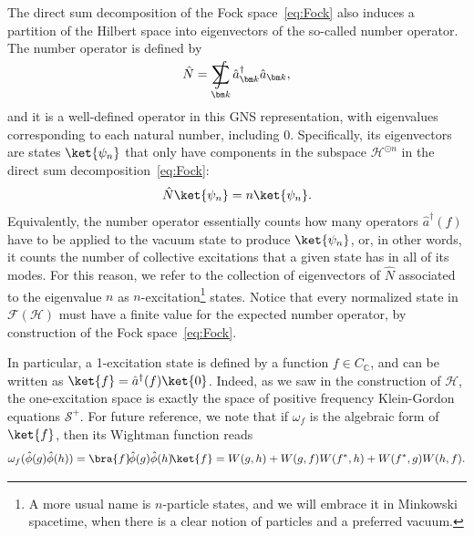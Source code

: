 \documentclass[letterpaper,12pt,titlepage,oneside,final]{book}
\renewcommand{\S}{\mathcal{S}}
\DeclareMathOperator*{\sumint}{%
\mathchoice%
  {\ooalign{$\displaystyle\sum$\cr\hidewidth$\displaystyle\int$\hidewidth\cr}}
  {\ooalign{\raisebox{.14\height}{\scalebox{.7}{$\textstyle\sum$}}\cr\hidewidth$\textstyle\int$\hidewidth\cr}}
  {\ooalign{\raisebox{.2\height}{\scalebox{.6}{$\scriptstyle\sum$}}\cr$\scriptstyle\int$\cr}}
  {\ooalign{\raisebox{.2\height}{\scalebox{.6}{$\scriptstyle\sum$}}\cr$\scriptstyle\int$\cr}}
}
\begin{document}
The direct sum decomposition of the Fock space~\eqref{eq:Fock} also induces a partition of the Hilbert space into eigenvectors of the so-called number operator. The number operator is defined by
\begin{equation}
    \hat{N} = \sumint_{\bm k} \hat{a}_{\bm k}^\dagger \hat{a}_{\bm k},
\end{equation}
and it is a well-defined operator in this GNS representation, with eigenvalues corresponding to each natural number, including $0$. Specifically, its eigenvectors are states $\ket{\psi_n}$ that only have components in the subspace $\mathscr{H}^{\odot n}$ in the direct sum decomposition~\eqref{eq:Fock}:
\begin{equation}
    \hat{N} \ket{\psi_n} = n \ket{\psi_n}.
\end{equation}
Equivalently, the number operator essentially counts how many operators $\hat{a}^\dagger(f)$ have to be applied to the vacuum state to produce $\ket{\psi_n}$, or, in other words, it counts the number of collective excitations that a given state has in all of its modes. For this reason, we refer to the collection of eigenvectors of $\hat{N}$ associated to the eigenvalue $n$ as $n$-excitation\footnote{A more usual name is $n$-particle states, and we will embrace it in Minkowski spacetime, when there is a clear notion of particles and a preferred vacuum.} states. Notice that every normalized state in $\mathcal{F}(\mathscr{H})$ must have a finite value for the expected number operator, by construction of the Fock space~\eqref{eq:Fock}.

In particular, a 1-excitation state is defined by a function $f\in C_\mathbb{C}$, and can be written as $\ket{f} = \hat{a}^\dagger(f) \ket{0}$. Indeed, as we saw in the construction of $\mathscr{H}$, the one-excitation space is exactly the space of positive frequency Klein-Gordon equations $\S^+$. For future reference, we note that if $\omega_f$ is the algebraic form of $\ket{f}$, then its Wightman function reads
\begin{equation}\label{eq:Wfg1part}
    \omega_f(\hat{\phi}(g)\hat{\phi}(h)) = \bra{f}\!\hat{\phi}(g)\hat{\phi}(h)\!\ket{f} = W(g,h) + W(g,f)W(f^*,h) + W(f^*,g)W(h,f).
\end{equation}
\end{document}
